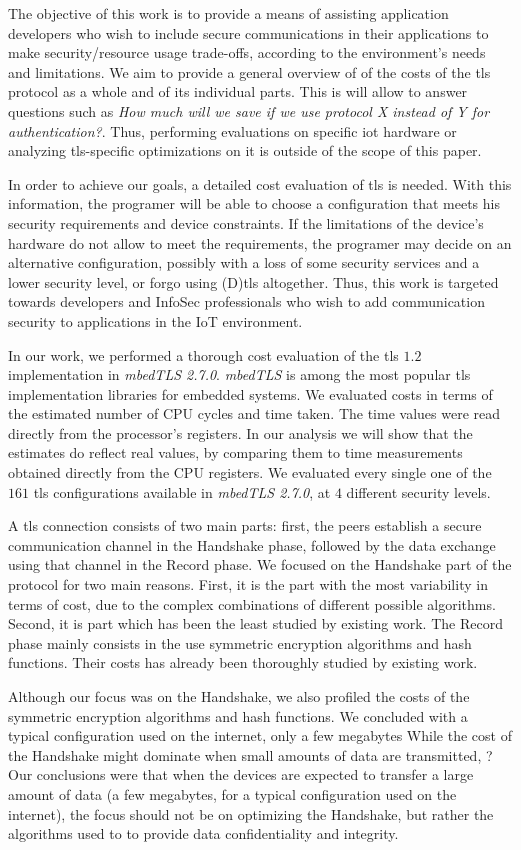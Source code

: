 The objective of this work is to provide a means of assisting application developers
who wish to include secure communications in their applications to make
security/resource usage trade-offs, according to the environment's needs
and limitations. We aim to provide a general overview of of the costs of the \gls{tls} protocol as a whole and
of its individual parts. This is will allow to answer questions such as \textit{How much will we save if we use protocol X instead of Y for authentication?}.
Thus, performing evaluations on specific \gls{iot} hardware or analyzing \gls{tls}-specific optimizations
on it is outside of the scope of this paper.

In order to achieve our goals, a detailed cost evaluation of \gls{tls} is needed. 
With this information, the programer will be able to choose a configuration that
meets his security requirements and device constraints. If the limitations of the device's hardware
do not allow to meet the requirements, the programer may decide on an alternative configuration, possibly with
a loss of some security services and a lower security level, or forgo using (D)\gls{tls} altogether.
Thus, this work is targeted towards developers and InfoSec professionals who wish to add communication security
to applications in the IoT environment.

In our work, we performed a thorough cost evaluation of the \gls{tls} $1.2$ implementation in \textit{mbedTLS 2.7.0}.
\textit{mbedTLS} is among the most popular \gls{tls} implementation libraries for embedded systems. We evaluated costs 
in terms of the estimated number of CPU cycles and time taken. The time values were read directly from
the processor's registers. In our analysis we will show that the estimates do reflect real values, by comparing them to time
measurements obtained directly from the CPU registers. We evaluated every single one of the $161$ \gls{tls} configurations available 
in \textit{mbedTLS 2.7.0}, at $4$ different security levels.

A \gls{tls} connection consists of two main parts: first, the peers establish a secure communication channel in the Handshake phase,
followed by the data exchange using that channel in the Record phase. We focused on the Handshake part of the protocol for two main reasons.
First, it is the part with the most variability in terms of cost, due to the complex combinations of different possible algorithms.
Second, it is part which has been the least studied by existing work. The Record phase mainly consists in the use symmetric encryption 
algorithms and hash functions. 
Their costs has already been thoroughly studied by existing work.

Although our focus was on the Handshake, we also profiled the costs of the symmetric encryption algorithms and hash functions. 
We concluded with a typical configuration used on the internet, only a few megabytes
While the cost of the
Handshake might dominate when small amounts of data are transmitted, ? Our conclusions were that when the devices are expected to transfer a large amount of data 
(a few megabytes, for a typical configuration used on the internet), the focus should not be on
optimizing the Handshake, but rather the algorithms used to to provide data confidentiality and integrity.